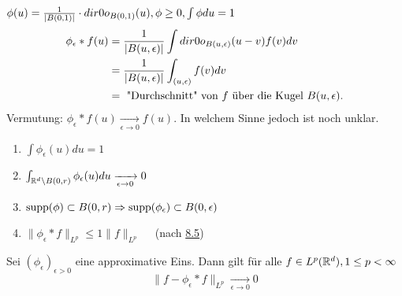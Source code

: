 \begin{beispiel*}
	$\phi(u) = \frac{1}{|B(0, 1)|} \cdot \1_{B(0, 1)}(u), \phi \geq 0, \int \phi du = 1	$ \\
	\begin{align*}
		\phi_{\epsilon} \ast f(u) & = \frac{1}{|B(u, \epsilon)|} \int \1_{B(u, \epsilon)}(u - v) f(v) dv \\
		&  = \frac{1}{|B(u, \epsilon)|} \int_{(u, \epsilon)} f(v) dv \\
		& = \text{ "Durchschnitt" von } f \text{ über die Kugel } B(u, \epsilon). 
	\end{align*}
	Vermutung: $\phi_{\epsilon} \ast f(u) \xrightarrow[\epsilon \rightarrow 0]{} f(u)$. In welchem Sinne jedoch ist noch unklar.
\end{beispiel*}


\begin{bemerkung} \label{bem:8.7}
	\begin{enumerate}[label=\roman*\upshape)]
		\label{bem:8.7i}
		\item $\int \phi_{\epsilon}(u) du = 1$
		\label{bem:8.7ii}
		\item $\int_{\mathbb{R}^{d} \setminus B(0, r)} \phi_{\epsilon}(u) du \xrightarrow[\epsilon \rightarrow 0]{} 0$
		\label{bem:8.7iii}
		\item $\operatorname{supp}(\phi) \subset B(0, r) \Rightarrow \operatorname{supp}(\phi_{\epsilon}) \subset B(0, \epsilon)$
		\label{bem:8.7iv}
		\item $\| \phi_{\epsilon} \ast f \|_{L^{p}} \leq 1 \| f \|_{L^{p}} \quad$ (nach \hyperref[satz:8.5-Young]{8.5})
	\end{enumerate}
\end{bemerkung}


\begin{satz}\label{satz:8.8}
	Sei $(\phi_{\epsilon})_{\epsilon > 0}$ eine approximative Eins. Dann gilt für alle $f \in L^{p}(\mathbb{R}^{d}), 1 \leq p < \infty$
		\[ \| f - \phi_{\epsilon} \ast f \|_{L^{p}} \xrightarrow[\epsilon \rightarrow 0]{} 0 \]
\end{satz}

